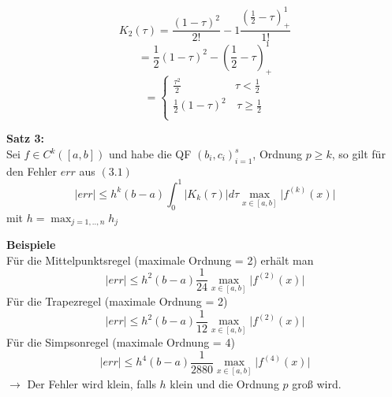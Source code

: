 \begin{nothing}
\begin{description}
      $$K_2(\tau) = \frac{(1-\tau)^2}{2!} - 1 \frac{(\frac{1}{2} - \tau)^1_+}{1!}$$
      $$= \frac{1}{2} (1-\tau)^2 - \left( \frac{1}{2} - \tau \right)_+^1$$
      $$ = \left\{
        \begin{array}{ll}
        \frac{\tau^2}{2}  & \tau < \frac{1}{2} \\
        \frac{1}{2}(1-\tau)^2 & \, \tau \geq \frac{1}{2} \\
        \end{array}
      \right. $$
    
    \item \textbf{Satz 3:} \\
      Sei $f \in C^k([a,b])$ und habe die QF $(b_i, c_i)^s_{i=1}$, Ordnung $p \geq k$, so gilt für den Fehler $err$ aus $(3.1)$ 
      $$ \vert err \vert \leq h^k (b-a) \int_0^1 \vert K_k(\tau) \vert d\tau \max_{x \in [a,b]} \vert f^{(k)}(x) \vert$$
      mit $h = \max_{j=1,..,n} h_j$
    
    \item \textbf{Beispiele} \\
      Für die Mittelpunktsregel (maximale Ordnung = 2) erhält man
      $$ \vert err \vert \leq h^2 (b-a) \frac{1}{24} \max_{x\in[a,b]} \vert f^{(2)}(x) \vert $$ 
      Für die Trapezregel (maximale Ordnung = 2)
      $$ \vert err \vert \leq h^2 (b-a) \frac{1}{12} \max_{x\in[a,b]} \vert f^{(2)}(x) \vert $$  
      Für die Simpsonregel (maximale Ordnung = 4)
      $$ \vert err \vert \leq h^4 (b-a) \frac{1}{2880} \max_{x\in[a,b]} \vert f^{(4)}(x) \vert $$ 
      $\rightarrow$ Der Fehler wird klein, falls $h$ klein und die Ordnung $p$ groß wird.
\end{description}
\end{nothing}
